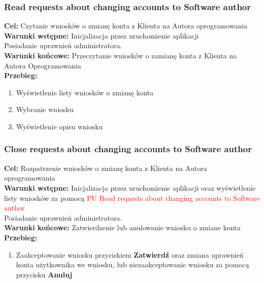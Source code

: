 \documentclass[12pt,a4paper]{article}
\begin{document}
\subsubsection{Read requests about changing accounts to Software author}
\textbf{Cel: } Czytanie wniosków o zmianę konta z Klienta na Autora oprogramowania \\
\textbf{Warunki wstępne:} Inicjalizacja przez uruchomienie aplikacji\\ Posiadanie uprawnień administratora.\\
\textbf{Warunki końcowe:} Przeczytanie wniosków o zamianę konta z Klienta na Autora Oprogramowania\\
\textbf{Przebieg:}
\begin{enumerate}
    \item Wyświetlenie listy wniosków o zmianę konta
    \item Wybranie wniosku
    \item Wyświetlenie opisu wniosku
    
\end{enumerate}

\subsubsection{Close requests about changing accounts to Software author}
\textbf{Cel: } Rozpatrzenie wniosków o zmianę konta z Klienta na Autora oprogramowania \\
\textbf{Warunki wstępne:} Inicjalizacja przez uruchomienie aplikacji oraz wyświetlenie listy wniosków za pomocą \textcolor{red}{PU Read requests about changing accounts to Software author}\\ Posiadanie uprawnień administratora.\\
\textbf{Warunki końcowe:} Zatwierdzenie lub anulowanie wniosku o zmiane konta\\
\textbf{Przebieg:}
\begin{enumerate}
    \item Zaakceptowanie wniosku przyciskiem \textbf{Zatwierdź} oraz zmiana uprawnień konta użytkownika we wniosku, lub niezaakceptowanie wniosku za pomocą przycisku \textbf{Anuluj}
\end{enumerate}
\end{document}
